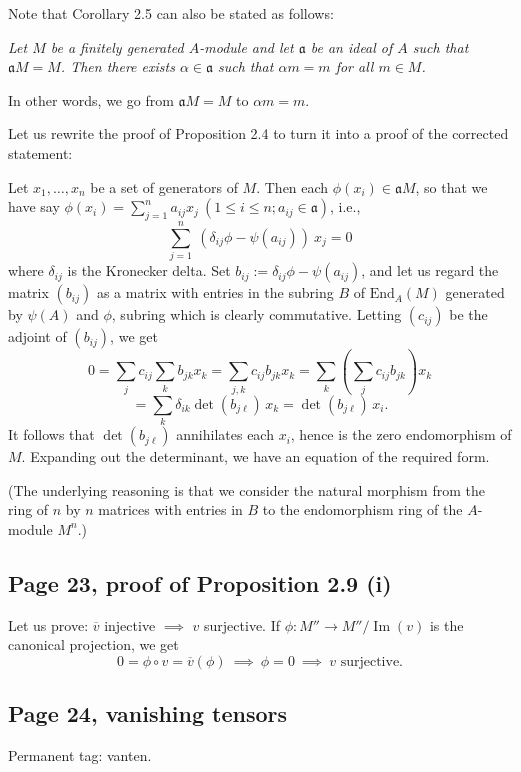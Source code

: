 \documentclass[parskip=half,fontsize=12pt]{scrartcl}%
\newcommand{\oo}{\operatorname}\newcommand{\ooo}{\operatorname*}
\newcommand{\mf}{\mathfrak}
\newcommand{\aaa}{\mf a}
\begin{document}
Note that Corollary 2.5 can also be stated as follows:

\emph{Let $M$ be a finitely generated $A$-module and let $\aaa$ be an ideal of $A$ such that $\aaa M=M$. Then there exists $\alpha\in\aaa$ such that $\alpha m=m$ for all $m\in M$.}

In other words, we go from $\aaa M=M$ to $\alpha m=m$.

Let us rewrite the proof of Proposition 2.4 to turn it into a proof of the corrected statement:%

Let $x_1,\dots,x_n$ be a set of generators of $M$. Then each $\phi(x_i)\in\aaa M$, so that we have say $\phi(x_i)=\sum_{j=1}^na_{ij}x_j\ (1\le i\le n; a_{ij}\in\aaa)$, i.e., 
$$
\sum_{j=1}^n\ (\delta_{ij}\phi-\psi(a_{ij}))\ x_j=0
$$ 
where $\delta_{ij}$ is the Kronecker delta. Set $b_{ij}:=\delta_{ij}\phi-\psi(a_{ij})$, and let us regard the matrix $(b_{ij})$ as a matrix with entries in the subring $B$ of $\text{End}_A(M)$ generated by $\psi(A)$ and $\phi$, subring which is clearly commutative. Letting $(c_{ij})$ be the adjoint of $(b_{ij})$, we get 
$$
0=\sum_jc_{ij}\sum_kb_{jk}x_k=\sum_{j,k}c_{ij}b_{jk}x_k=\sum_k\left(\sum_jc_{ij}b_{jk}\right)x_k
$$ 
$$
=\sum_k\delta_{ik}\det(b_{j\ell})\,x_k=\det(b_{j\ell})\,x_i.
$$ %
It follows that $\det(b_{j\ell})$ annihilates each $x_i$, hence is the zero endomorphism of $M$. Expanding out the determinant, we have an equation of the required form.

(The underlying reasoning is that we consider the natural morphism from the ring of $n$ by $n$ matrices with entries in $B$ to the endomorphism ring of the $A$-module $M^n$.)

\subsection{Page 23, proof of Proposition 2.9 (i)}%

Let us prove: $\overline v$ injective $\implies$ $v$ surjective. If $\phi:M''\to M''/\oo{Im}(v)$ is the canonical projection, we get 
$$
0=\phi\circ v=\overline v(\phi)\ \implies\ \phi=0\ \implies\ v\text{ surjective.}
$$

\subsection{Page 24, vanishing tensors}\label{vt}%

Permanent tag: vanten.
\end{document}
